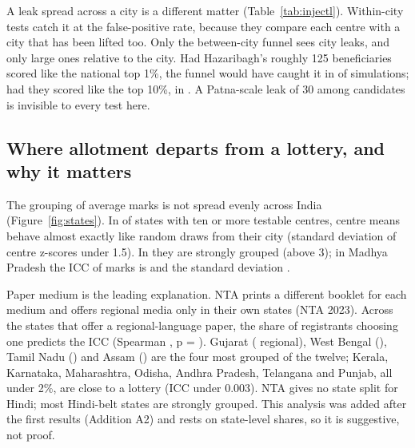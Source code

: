 \documentclass[11pt]{article}
\begin{document}
A leak spread across a city is a different matter (Table~\ref{tab:injectl}). Within-city tests catch it at the false-positive rate, because they compare each centre with a city that has been lifted too. Only the between-city funnel sees city leaks, and only large ones relative to the city. Had Hazaribagh's roughly 125 beneficiaries scored like the national top 1\%, the funnel would have caught it in \InjectHazaribaghOneTwoFiveFunnel{} of simulations; had they scored like the top 10\%, in \InjectHazaribaghTopOneZeroOneTwoFiveFunnel. A Patna-scale leak of 30 among \GeoPatnaN{} candidates is invisible to every test here.

\begin{table}[htbp]\centering
\caption{Centre fraud: share of 400 injections detected, by number of boosted candidates and centre size. Each cell: registered screen / tail beyond the bulk.}\label{tab:injectc}

\end{table}

\begin{table}[htbp]\centering
\caption{City leaks: share of 400 injections detected. ``A random city'' is drawn from cities with at least five times as many candidates as beneficiaries. Beneficiaries' marks are drawn from the national top 1\% unless the scenario says top 10\%. The funnel counts a detection only when the city was not already above its upper limit.}\label{tab:injectl}

\end{table}

\subsection{Where allotment departs from a lottery, and why it matters}\label{sec:states}
The grouping of average marks is not spread evenly across India (Figure~\ref{fig:states}). In \MediumLotteryLikeStates{} of \MediumStates{} states with ten or more testable centres, centre means behave almost exactly like random draws from their city (standard deviation of centre z-scores under 1.5). In \MediumSortedStates{} they are strongly grouped (above 3); in Madhya Pradesh the ICC of marks is \StateMadhyapradeshIcc{} and the standard deviation \StateMadhyapradeshSdz.

Paper medium is the leading explanation. NTA prints a different booklet for each medium and offers regional media only in their own states (NTA 2023). Across the \MediumRegionalStates{} states that offer a regional-language paper, the share of registrants choosing one predicts the ICC (Spearman \MediumSpearman, p = \MediumSpearmanP). Gujarat (\StateGujaratRegshare{} regional), West Bengal (\StateWestbengalRegshare), Tamil Nadu (\StateTamilnaduRegshare) and Assam (\StateAssamRegshare) are the four most grouped of the twelve; Kerala, Karnataka, Maharashtra, Odisha, Andhra Pradesh, Telangana and Punjab, all under 2\%, are close to a lottery (ICC under 0.003). NTA gives no state split for Hindi; most Hindi-belt states are strongly grouped. This analysis was added after the first results (Addition A2) and rests on state-level shares, so it is suggestive, not proof.
\end{document}
